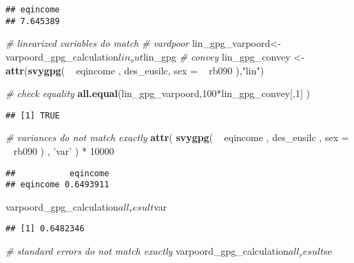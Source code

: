 \documentclass[]{book}
\newenvironment{Shaded}{\begin{snugshade}}{\end{snugshade}}
\newcommand{\KeywordTok}[1]{\textcolor[rgb]{0.13,0.29,0.53}{\textbf{{#1}}}}
\newcommand{\DataTypeTok}[1]{\textcolor[rgb]{0.13,0.29,0.53}{{#1}}}
\newcommand{\DecValTok}[1]{\textcolor[rgb]{0.00,0.00,0.81}{{#1}}}
\newcommand{\StringTok}[1]{\textcolor[rgb]{0.31,0.60,0.02}{{#1}}}
\newcommand{\CommentTok}[1]{\textcolor[rgb]{0.56,0.35,0.01}{\textit{{#1}}}}
\newcommand{\NormalTok}[1]{{#1}}
\begin{document}
\begin{verbatim}
## eqincome 
## 7.645389
\end{verbatim}

\begin{Shaded}
\begin{Highlighting}[]
\CommentTok{# linearized variables do match}
\CommentTok{# vardpoor}
\NormalTok{lin_gpg_varpoord<-}\StringTok{ }\NormalTok{varpoord_gpg_calculation$lin_out$lin_gpg}
\CommentTok{# convey }
\NormalTok{lin_gpg_convey <-}\StringTok{ }\KeywordTok{attr}\NormalTok{(}\KeywordTok{svygpg}\NormalTok{( ~}\StringTok{ }\NormalTok{eqincome , des_eusilc, }\DataTypeTok{sex =} \NormalTok{~}\StringTok{ }\NormalTok{rb090 ),}\StringTok{"lin"}\NormalTok{)}

\CommentTok{# check equality}
\KeywordTok{all.equal}\NormalTok{(lin_gpg_varpoord,}\DecValTok{100}\NormalTok{*lin_gpg_convey[,}\DecValTok{1}\NormalTok{] )}
\end{Highlighting}
\end{Shaded}

\begin{verbatim}
## [1] TRUE
\end{verbatim}

\begin{Shaded}
\begin{Highlighting}[]
\CommentTok{# variances do not match exactly}
\KeywordTok{attr}\NormalTok{( }\KeywordTok{svygpg}\NormalTok{( ~}\StringTok{ }\NormalTok{eqincome , des_eusilc , }\DataTypeTok{sex =} \NormalTok{~}\StringTok{ }\NormalTok{rb090 ) , }\StringTok{'var'} \NormalTok{) *}\StringTok{ }\DecValTok{10000}
\end{Highlighting}
\end{Shaded}

\begin{verbatim}
##           eqincome
## eqincome 0.6493911
\end{verbatim}

\begin{Shaded}
\begin{Highlighting}[]
\NormalTok{varpoord_gpg_calculation$all_result$var}
\end{Highlighting}
\end{Shaded}

\begin{verbatim}
## [1] 0.6482346
\end{verbatim}

\begin{Shaded}
\begin{Highlighting}[]
\CommentTok{# standard errors do not match exactly}
\NormalTok{varpoord_gpg_calculation$all_result$se}
\end{Highlighting}
\end{Shaded}
\end{document}
